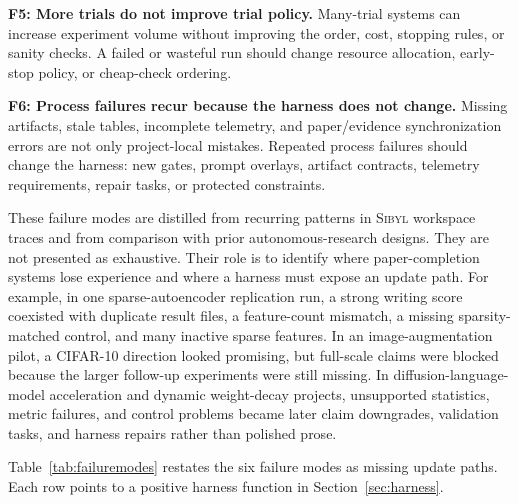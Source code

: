 \documentclass{article}
\newcommand{\sibyl}{\textsc{Sibyl}}
\begin{document}
\textbf{F5: More trials do not improve trial policy.}
Many-trial systems can increase experiment volume without improving the order, cost, stopping rules, or sanity checks. A failed or wasteful run should change resource allocation, early-stop policy, or cheap-check ordering.

\textbf{F6: Process failures recur because the harness does not change.}
Missing artifacts, stale tables, incomplete telemetry, and paper/evidence synchronization errors are not only project-local mistakes. Repeated process failures should change the harness: new gates, prompt overlays, artifact contracts, telemetry requirements, repair tasks, or protected constraints.

These failure modes are distilled from recurring patterns in \sibyl{} workspace traces and from comparison with prior autonomous-research designs. They are not presented as exhaustive. Their role is to identify where paper-completion systems lose experience and where a harness must expose an update path. For example, in one sparse-autoencoder replication run, a strong writing score coexisted with duplicate result files, a feature-count mismatch, a missing sparsity-matched control, and many inactive sparse features. In an image-augmentation pilot, a CIFAR-10 direction looked promising, but full-scale claims were blocked because the larger follow-up experiments were still missing. In diffusion-language-model acceleration and dynamic weight-decay projects, unsupported statistics, metric failures, and control problems became later claim downgrades, validation tasks, and harness repairs rather than polished prose.

Table~\ref{tab:failuremodes} restates the six failure modes as missing update paths. Each row points to a positive harness function in Section~\ref{sec:harness}.
\end{document}
